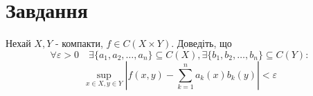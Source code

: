 
\chapter{Завдання \theHchapter}

\begin{tcolorbox}[title=Завдання]
    Нехай $X, Y$ - компакти, $f \in C(X \times Y)$. Доведіть, що
    $$\forall \varepsilon>0 \quad \exists\{a_1, a_2, \ldots, a_n\} 
    \subseteq C(X), \exists\{b_1, b_2, \ldots, b_n\} \subseteq C(Y):$$
    $$\sup _{x \in X, y \in Y}|f(x, y)-
    \sum_{k=1}^n a_k(x) b_k(y)| <\varepsilon$$
\end{tcolorbox}

